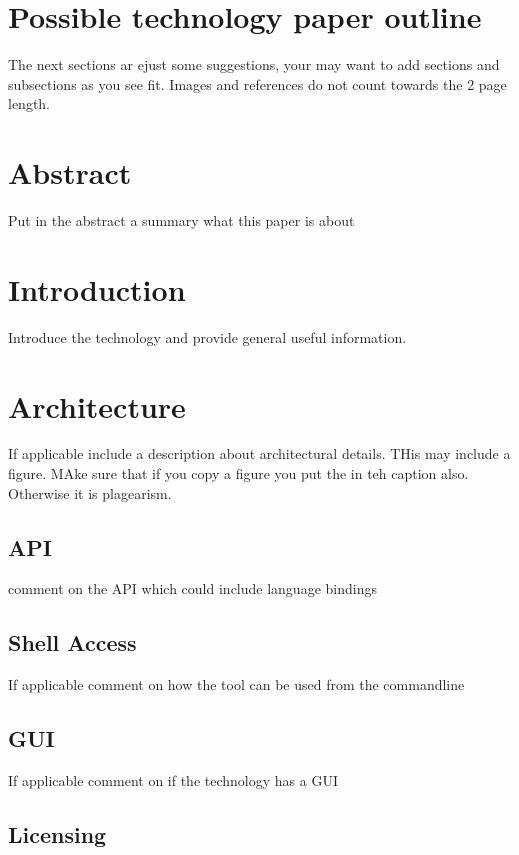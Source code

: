 \documentclass[9pt,twocolumn,twoside]{styles/osajnl}
\begin{document}
\section{Possible technology paper outline}

The next sections ar ejust some suggestions, your may want to add
sections and subsections as you see fit. Images and references do not
count towards the 2 page length.

\section{Abstract}

Put in the abstract a summary what this paper is about

\section{Introduction}

Introduce the technology and provide general useful information.

\section{Architecture} 

If applicable include a description about architectural details. THis
may include a figure. MAke sure that if you copy a figure you put the
\cite{?} in teh caption also. Otherwise it is plagearism.

\subsection{API}

comment on the API which could include language bindings

\subsection{Shell Access}

If applicable comment on how the tool can be used from the commandline

\subsection{GUI}

If applicable comment on if the technology has a GUI

\subsection{Licensing}
\end{document}
